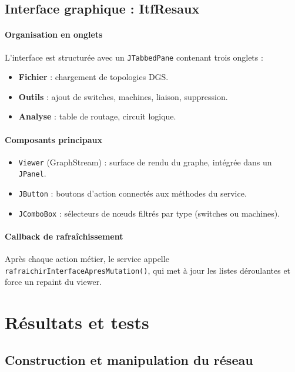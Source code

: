 \documentclass[12pt, a4paper]{article}
\begin{document}
\subsection{Interface graphique : ItfResaux}

\paragraph{Organisation en onglets}
L'interface est structurée avec un \texttt{JTabbedPane} contenant trois onglets :
\begin{itemize}
    \item \textbf{Fichier} : chargement de topologies DGS.
    \item \textbf{Outils} : ajout de switches, machines, liaison, suppression.
    \item \textbf{Analyse} : table de routage, circuit logique.
\end{itemize}

\paragraph{Composants principaux}
\begin{itemize}
    \item \texttt{Viewer} (GraphStream) : surface de rendu du graphe, intégrée dans un \texttt{JPanel}.
    \item \texttt{JButton} : boutons d'action connectés aux méthodes du service.
    \item \texttt{JComboBox} : sélecteurs de nœuds filtrés par type (switches ou machines).
\end{itemize}

\paragraph{Callback de rafraîchissement}
Après chaque action métier, le service appelle \texttt{rafraichirInterfaceApresMutation()}, qui met à jour les listes déroulantes et force un repaint du viewer.

\section{Résultats et tests}

\subsection{Construction et manipulation du réseau}
\end{document}

